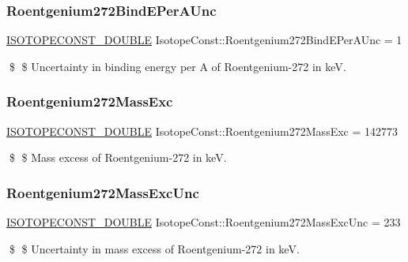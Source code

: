 \subsubsection{\texorpdfstring{Roentgenium272\+Bind\+E\+Per\+A\+Unc}{Roentgenium272BindEPerAUnc}}
{\footnotesize\ttfamily \mbox{\hyperlink{group___isotope_const-_macros_ga8f45a7272ce02c0b4c65c44636ed719a}{I\+S\+O\+T\+O\+P\+E\+C\+O\+N\+S\+T\+\_\+\+D\+O\+U\+B\+LE}} Isotope\+Const\+::\+Roentgenium272\+Bind\+E\+Per\+A\+Unc = 1}

\$ \$ Uncertainty in binding energy per A of Roentgenium-\/272 in keV. \mbox{\label{group___isotope_const-_roentgenium-_rg272_ga4d2a09d0d572eda79c5582e48b58e7a2}} 
\subsubsection{\texorpdfstring{Roentgenium272\+Mass\+Exc}{Roentgenium272MassExc}}
{\footnotesize\ttfamily \mbox{\hyperlink{group___isotope_const-_macros_ga8f45a7272ce02c0b4c65c44636ed719a}{I\+S\+O\+T\+O\+P\+E\+C\+O\+N\+S\+T\+\_\+\+D\+O\+U\+B\+LE}} Isotope\+Const\+::\+Roentgenium272\+Mass\+Exc = 142773}

\$ \$ Mass excess of Roentgenium-\/272 in keV. \mbox{\label{group___isotope_const-_roentgenium-_rg272_ga2054ef1650e654af8c026e0b2232d40e}} 
\subsubsection{\texorpdfstring{Roentgenium272\+Mass\+Exc\+Unc}{Roentgenium272MassExcUnc}}
{\footnotesize\ttfamily \mbox{\hyperlink{group___isotope_const-_macros_ga8f45a7272ce02c0b4c65c44636ed719a}{I\+S\+O\+T\+O\+P\+E\+C\+O\+N\+S\+T\+\_\+\+D\+O\+U\+B\+LE}} Isotope\+Const\+::\+Roentgenium272\+Mass\+Exc\+Unc = 233}

\$ \$ Uncertainty in mass excess of Roentgenium-\/272 in keV. \mbox{\label{group___isotope_const-_roentgenium-_rg272_ga540afa33ebfd4a15408e4eb551dc92de}} 
